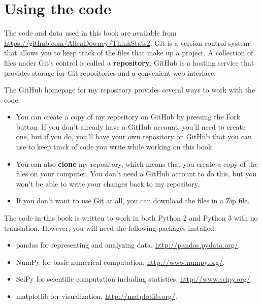 \documentclass[12pt]{book}
\begin{document}
\section*{Using the code}
\label{code}


The code and data used in this book are available from
\url{https://github.com/AllenDowney/ThinkStats2}.  Git is a version
control system that allows you to keep track of the files that
make up a project.  A collection of files under Git's control is
called a {\bf repository}.  GitHub is a hosting service that provides
storage for Git repositories and a convenient web interface.

The GitHub homepage for my repository provides several ways to
work with the code:

\begin{itemize}

\item You can create a copy of my repository
on GitHub by pressing the {\sf Fork} button.  If you don't already
have a GitHub account, you'll need to create one, but if you do, you'll
have your own repository on GitHub that you can use to keep track
of code you write while working on this book.

\item You can also {\bf clone}
my repository, which means that you create a copy of the files on
your computer.  You don't need a GitHub account to do this, but you
won't be able to write your changes back to my repository.

\item If you don't want to use Git at all, you can download the files
in a Zip file.

\end{itemize}

The code in this book is written to work in both Python 2 and Python 3
with no translation.  However, you will need the following packages
installed: 

\begin{itemize}

\item pandas for representing and analyzing data,
  \url{http://pandas.pydata.org/}.

\item NumPy for basic numerical computation, \url{http://www.numpy.org/}.

\item SciPy for scientific computation including statistics,
  \url{http://www.scipy.org/}.

\item matplotlib for visualization, \url{http://matplotlib.org/}.

\end{itemize}
\end{document}
